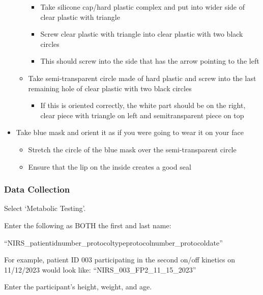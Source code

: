 \documentclass[
]{book}
\providecommand{\tightlist}{%
  \setlength{\itemsep}{0pt}\setlength{\parskip}{0pt}}
\begin{document}
\begin{itemize}
\begin{itemize}
    \begin{itemize}
    \tightlist
    \item
      Take silicone cap/hard plastic complex and put into wider side of clear plastic with triangle
    \item
      Screw clear plastic with triangle into clear plastic with two black circles
    \item
      This should screw into the side that has the arrow pointing to the left
    \end{itemize}
  \item
    Take semi-transparent circle made of hard plastic and screw into the last remaining hole of clear plastic with two black circles

    \begin{itemize}
    \tightlist
    \item
      If this is oriented correctly, the white part should be on the right, clear piece with triangle on left and semitransparent piece on top
    \end{itemize}
  \end{itemize}
\item
  Take blue mask and orient it as if you were going to wear it on your face

  \begin{itemize}
  \tightlist
  \item
    Stretch the circle of the blue mask over the semi-transparent circle
  \item
    Ensure that the lip on the inside creates a good seal
  \end{itemize}
\end{itemize}

\hypertarget{Appendix-Instruments-Parvo-Usage-DataCollection}{%
\subsubsection{Data Collection}\label{Appendix-Instruments-Parvo-Usage-DataCollection}}

Select `Metabolic Testing'.

Enter the following as BOTH the first and last name:

``NIRS\_patientidnumber\_protocoltypeprotocolnumber\_protocoldate''

For example, patient ID 003 participating in the second on/off kinetics on 11/12/2023 would look like:
``NIRS\_003\_FP2\_11\_15\_2023''

Enter the participant's height, weight, and age.
\end{document}
